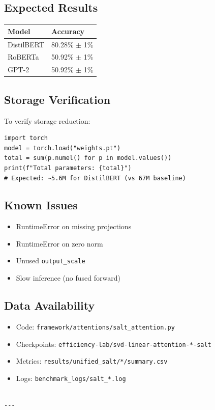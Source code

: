 \subsection{Expected Results}

\begin{table}[H]
\centering
\small
\begin{tabular}{ll}
\toprule
\textbf{Model} & \textbf{Accuracy} \\
\midrule
DistilBERT & 80.28\% $\pm$ 1\% \\
RoBERTa & 50.92\% $\pm$ 1\% \\
GPT-2 & 50.92\% $\pm$ 1\% \\
\bottomrule
\end{tabular}
\end{table}

\subsection{Storage Verification}

To verify storage reduction:

\begin{lstlisting}
import torch
model = torch.load("weights.pt")
total = sum(p.numel() for p in model.values())
print(f"Total parameters: {total}")
# Expected: ~5.6M for DistilBERT (vs 67M baseline)
\end{lstlisting}

\subsection{Known Issues}

\begin{itemize}
\item RuntimeError on missing projections
\item RuntimeError on zero norm
\item Unused \texttt{output\_scale}
\item Slow inference (no fused forward)

\end{itemize}
\subsection{Data Availability}

\begin{itemize}
\item Code: \texttt{framework/attentions/salt\_attention.py}
\item Checkpoints: \texttt{efficiency-lab/svd-linear-attention-*-salt}
\item Metrics: \texttt{results/unified\_salt/*/summary.csv}
\item Logs: \texttt{benchmark\_logs/salt\_*.log}
\end{itemize}
\begin{lstlisting}

---
\end{lstlisting}


